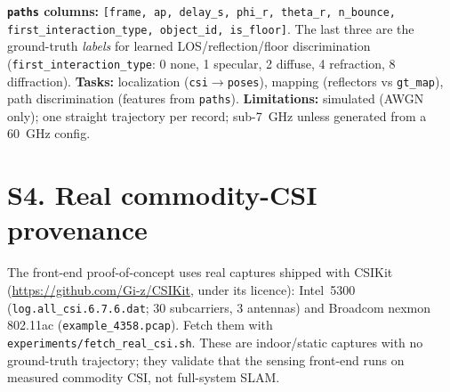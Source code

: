 \documentclass[10pt]{article}
\begin{document}
\textbf{\texttt{paths} columns:} \texttt{[frame, ap, delay\_s, phi\_r, theta\_r,
n\_bounce, first\_interaction\_type, object\_id, is\_floor]}. The last three are the
ground-truth \emph{labels} for learned LOS/reflection/floor discrimination
(\texttt{first\_interaction\_type}: 0 none, 1 specular, 2 diffuse, 4 refraction,
8 diffraction). \textbf{Tasks:} localization (\texttt{csi}$\to$\texttt{poses}),
mapping (reflectors vs \texttt{gt\_map}), path discrimination (features from
\texttt{paths}). \textbf{Limitations:} simulated (AWGN only); one straight trajectory
per record; sub-7~GHz unless generated from a 60~GHz config.

\section*{S4. Real commodity-CSI provenance}
The front-end proof-of-concept uses real captures shipped with CSIKit
(\url{https://github.com/Gi-z/CSIKit}, under its licence): Intel~5300
(\texttt{log.all\_csi.6.7.6.dat}; 30 subcarriers, 3 antennas) and Broadcom nexmon
802.11ac (\texttt{example\_4358.pcap}). Fetch them with
\texttt{experiments/fetch\_real\_csi.sh}. These are indoor/static captures with no
ground-truth trajectory; they validate that the sensing front-end runs on measured
commodity CSI, not full-system SLAM.
\end{document}
